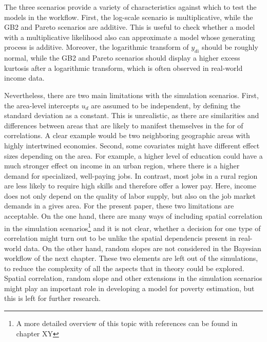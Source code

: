 The three scenarios provide a variety of characteristics against which to test the models in the workflow.
First, the log-scale scenario is multiplicative, while the GB2 and Pareto scenarios are additive.
This is useful to check whether a model with a multiplicative likelihood also can approximate a model whose generating process is additive.
Moreover, the logarithmic transform of $y_{di}$ should be roughly normal, while the GB2 and Pareto scenarios should display a higher excess kurtosis after a logarithmic transform, which is often observed in real-world income data.

Nevertheless, there are two main limitations with the simulation scenarios.
First, the area-level intercepts $u_d$ are assumed to be independent, by defining the standard deviation as a constant.
This is unrealistic, as there are similarities and differences between areas that are likely to manifest themselves in the for of correlations.
A clear example would be two neighboring geographic areas with highly intertwined economies.
Second, some covariates might have different effect sizes depending on the area.
For example, a higher level of education could have a much stronger effect on income in an urban region, where there is a higher demand for specialized, well-paying jobs.
In contrast, most jobs in a rural region are less likely to require high skills and therefore offer a lower pay.
Here, income does not only depend on the quality of labor supply, but also on the job market demands in a gives area.
For the present paper, these two limitations are acceptable.
On the one hand, there are many ways of including spatial correlation in the simulation scenarios\footnote{A more detailed overview of this topic with references can be found in chapter XY} and it is not clear, whether a decision for one type of correlation might turn out to be unlike the spatial dependencis present in real-world data.
On the other hand, random slopes are not considered in the Bayesian workflow of the next chapter.
These two elements are left out of the simulations, to reduce the complexity of all the aspects that in theory could be explored.
Spatial correlation, random slope and other extensions in the simulation scenarios might play an important role in developing a model for poverty estimation, but this is left for further research.